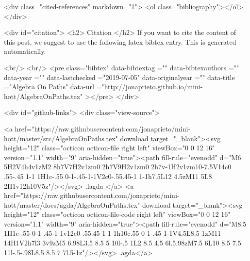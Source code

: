   <div class="cited-references" markdown="1">
  <ol class="bibliography"></ol>
  </div>


  
  <div id="citation">
  <h2> Citation </h2>
  If you want to cite the content of this post,
  we suggest to use the following latex bibtex entry.
  This is generated automatically.

  <br/>
  <br/>
  <pre class="bibtex"
       data-bibtextag =""
       data-bibtexauthors =""
       data-year =""
       data-lastchecked ="2019-07-05"
       data-originalyear =""
       data-title ="Algebra On Paths"
       data-url ="http://jonaprieto.github.io/mini-hott/AlgebraOnPaths.tex"
  ></pre>
  </div>
  

  <div id="github-links">
    <div class="view-source">
      
        <a href="https://raw.githubusercontent.com/jonaprieto/mini-hott/master/src/AlgebraOnPaths.tex" download target="_blank"><svg height="12" class="octicon octicon-file right left" viewBox="0 0 12 16" version="1.1" width="9" aria-hidden="true"><path fill-rule="evenodd" d="M6 5H2V4h4v1zM2 8h7V7H2v1zm0 2h7V9H2v1zm0 2h7v-1H2v1zm10-7.5V14c0 .55-.45 1-1 1H1c-.55 0-1-.45-1-1V2c0-.55.45-1 1-1h7.5L12 4.5zM11 5L8 2H1v12h10V5z"/></svg> .lagda </a>
        <a href="https://raw.githubusercontent.com/jonaprieto/mini-hott/master/docs/agda/AlgebraOnPaths.tex" download target="_blank"><svg height="12" class="octicon octicon-file-code right left" viewBox="0 0 12 16" version="1.1" width="9" aria-hidden="true"><path fill-rule="evenodd" d="M8.5 1H1c-.55 0-1 .45-1 1v12c0 .55.45 1 1 1h10c.55 0 1-.45 1-1V4.5L8.5 1zM11 14H1V2h7l3 3v9zM5 6.98L3.5 8.5 5 10l-.5 1L2 8.5 4.5 6l.5.98zM7.5 6L10 8.5 7.5 11l-.5-.98L8.5 8.5 7 7l.5-1z"/></svg> .agda</a>
      
